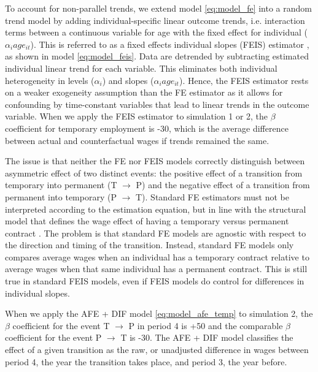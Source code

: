 To account for non-parallel trends, we extend model \ref{eq:model_fe} into a random trend model by adding individual-specific linear outcome trends, i.e. interaction terms between a continuous variable for age with the fixed effect for individual ($\alpha_i age_{it}$).  This is referred to as a fixed effects individual slopes (FEIS) estimator  \citep{ludwig_is_2018}, as shown in model \ref{eq:model_feis}.  Data are detrended by subtracting estimated individual linear trend for each variable. This eliminates both individual heterogeneity in levels ($\alpha_i$) and slopes ($\alpha_i age_{it}$). Hence, the FEIS estimator rests on a weaker exogeneity assumption than the FE estimator as it allows for confounding by time-constant variables that lead to linear trends in the outcome variable. When we apply the FEIS estimator to simulation 1 or 2, the $\beta$ coefficient for temporary employment is -30, which is the average difference between actual and counterfactual wages if trends remained the same. 


The issue is that neither the FE nor FEIS models correctly distinguish between asymmetric effect of two distinct events: the positive effect of a transition from temporary into permanent (T $\rightarrow$ P) and the negative effect of a transition from permanent into temporary (P $\rightarrow$ T).  Standard FE estimators must not be interpreted according to the estimation equation, but in line with the structural model that defines the wage effect of having a temporary versus permanent contract \citep{an_causal_2017,wooldridge_econometric_2010}.   The problem is that standard FE models are agnostic with respect to the direction and timing of the transition. Instead, standard FE models only compares average wages when an individual has a temporary contract relative to average wages when that same individual has a permanent contract.  This is still true in standard FEIS models, even if FEIS models do control for differences in individual slopes. 

When we apply the AFE + DIF model \ref{eq:model_afe_temp} to simulation 2, the $\beta$ coefficient for the event T $\rightarrow$ P in period 4 is +50 and the comparable $\beta$ coefficient for the event P $\rightarrow$ T is -30.  The AFE + DIF model classifies the effect of a given transition as the raw, or unadjusted difference in wages between period 4, the year the transition takes place, and period 3, the year before.   

